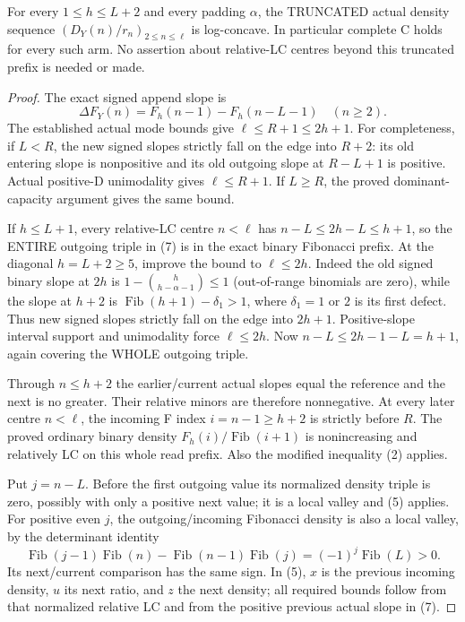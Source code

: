 \begin{lemma}
For every $1\le h\le L+2$ and every padding $\alpha$, the
TRUNCATED actual density sequence $(D_Y(n)/r_n)_{2\le n\le\ell}$
is log-concave.  In particular complete C holds for every such arm.
No assertion about relative-LC centres beyond this truncated prefix
is needed or made.
\end{lemma}
\begin{proof}
The exact signed append slope is
\[
             \Delta F_Y(n)=F_h(n-1)-F_h(n-L-1)\quad(n\ge2). \tag{7}
\]
The established actual mode bounds give $\ell\le R+1\le2h+1$.
For completeness, if $L<R$, the new signed slopes strictly fall
on the edge into $R+2$: its old entering slope is nonpositive
and its old outgoing slope at $R-L+1$ is positive.
Actual positive-D unimodality gives $\ell\le R+1$.
If $L\ge R$, the proved dominant-capacity argument gives the same bound.

If $h\le L+1$, every relative-LC centre $n<\ell$ has
$n-L\le2h-L\le h+1$, so the ENTIRE outgoing triple in (7)
is in the exact binary Fibonacci prefix.
At the diagonal $h=L+2\ge5$, improve the bound to $\ell\le2h$.
Indeed the old signed binary slope at $2h$ is
$1-\binom h{h-\alpha-1}\le1$ (out-of-range binomials are zero),
while the slope at $h+2$ is $\operatorname{Fib}(h+1)-\delta_1>1$,
where $\delta_1=1$ or $2$ is its first defect.
Thus new signed slopes strictly fall on the edge into $2h+1$.
Positive-slope interval support and unimodality force $\ell\le2h$.
Now $n-L\le2h-1-L=h+1$, again covering the WHOLE outgoing triple.

Through $n\le h+2$ the earlier/current actual slopes equal
the reference and the next is no greater.  Their relative minors
are therefore nonnegative.  At every later centre $n<\ell$,
the incoming F index $i=n-1\ge h+2$ is strictly before $R$.
The proved ordinary binary density $F_h(i)/\operatorname{Fib}(i+1)$
is nonincreasing and relatively LC on this whole read prefix.
Also the modified inequality (2) applies.

Put $j=n-L$.  Before the first outgoing value its normalized density
triple is zero, possibly with only a positive next value; it is a local
valley and (5) applies.  For positive even $j$, the outgoing/incoming
Fibonacci density is also a local valley, by the determinant identity
\[
 \operatorname{Fib}(j-1)\operatorname{Fib}(n)
  -\operatorname{Fib}(n-1)\operatorname{Fib}(j)
                       =(-1)^j\operatorname{Fib}(L)>0.
\]
Its next/current comparison has the same sign.  In (5), $x$ is
the previous incoming density, $u$ its next ratio, and $z$ the next
density; all required bounds follow from that normalized relative LC
and from the positive previous actual slope in (7).


\end{proof}
